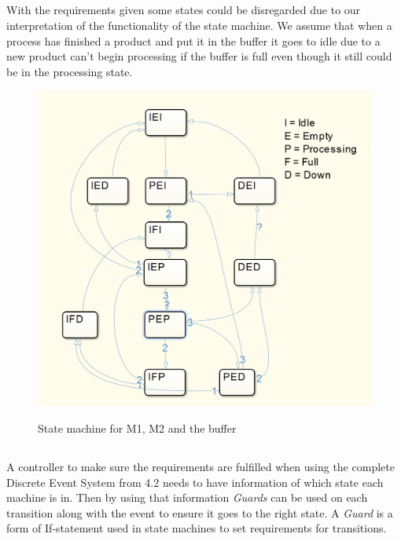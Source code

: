 \documentclass[12pt,a4paper]{article}
\begin{document}
\subsection{}
With the requirements given some states could be disregarded due to our interpretation of the functionality of the state machine. We assume that when a process has finished a product and put it in the buffer it goes to idle due to a new product can't begin processing if the buffer is full even though it still could be in the processing state.	
\begin{center}
	\begin{figure}[H]
      \centering
	\includegraphics[scale=0.5]{des3.png}
	\label{fig:des1}
	\caption{State machine for M1, M2 and the buffer}
	\end{figure}
\end{center}

\subsection{}
A controller to make sure the requirements are fulfilled when using the complete Discrete Event System from 4.2 needs to have information of which state each machine is in. Then by using that information \emph{Guards} can be used on each transition along with the event to ensure it goes to the right state. A \emph{Guard} is a form of If-statement used in state machines to set requirements for transitions.
\end{document}
